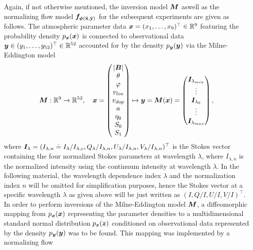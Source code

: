 \documentclass[a4paper,12pt]{report}
\begin{document}
Again, if not otherwise mentioned, the inversion model $\bm{M}$ aswell as the normalizing flow model $\bm{f}_{\bm{\phi}(\hat{\boldsymbol{\mathbf{x}}},\hat{\boldsymbol{\mathbf{y}}})}$ for the subsequent experiments are given as follows. The atmospheric parameter data $\bm{x} = (x_1,\dots,x_9)^\top \in \mathbb{R}^9$ featuring the probability density $p_{\bm{x}}(\bm{x})$ is connected to observational data $\bm{y} \in (y_1,\dots,y_{52})^\top \in \mathbb{R}^{52}$ accounted for by the density $p_{\bm{y}}(\bm{y})$ via the Milne-Eddington model
\begin{equation}\label{model:Milne-Eddington_obs}
\bm{M}:\mathbb{R}^9 \rightarrow \mathbb{R}^{52}, \quad \bm{x} = \begin{pmatrix}
|\bm{B}| \\
\theta \\
\varphi \\
v_{los} \\
v_{dop} \\
a \\
\eta_0 \\
S_0 \\
S_1
\end{pmatrix} \mapsto \bm{y} = \bm{M}(\bm{x}) = \begin{pmatrix}
\bm{I}_{\lambda_{min}} \\
\vdots \\
\bm{I}_{\lambda_0} \\
\vdots \\
\bm{I}_{\lambda_{max}}
\end{pmatrix},
\end{equation} where $\bm{I}_\lambda = (I_{\lambda,n} \doteq I_\lambda/I_{\lambda,c}, Q_\lambda/I_{\lambda,n}, U_\lambda/I_{\lambda,n}, V_\lambda/I_{\lambda,n})^\top$ is the Stokes vector containing the four normalized Stokes parameters at wavelength $\lambda$, where $I_{\lambda,n}$ is the normalized intensity using the continuum intensity at wavelength $\lambda$. In the following material, the wavelength dependence index $\lambda$ and the normalization index $n$ will be omitted for simplification purposes, hence the Stokes vector at a specific wavelength $\lambda$ as given above will be just written as $(I, Q/I, U/I, V/I)^\top$. In order to perform inversions of the Milne-Eddington model $\bm{M}$, a diffeomorphic mapping from $p_{\bm{x}}(\bm{x})$ representing the parameter densities to a multidimensional standard normal distribution $p_{\bm{z}}(\bm{z})$ conditioned on observational data represented by the density $p_{\bm{y}}(\bm{y})$ was to be found. This mapping was implemented by a normalizing flow
\end{document}
